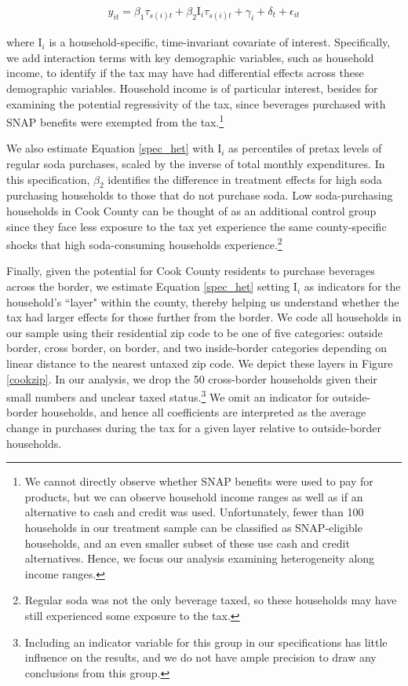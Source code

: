 \documentclass[12pt]{article}
\begin{document}
\begin{align}
	y_{it} = \beta_1 \tau_{s(i)t} + \beta_2 \text{I}_{i} \tau_{s(i)t} + \gamma_i + \delta_t + \epsilon_{it} \label{spec_het}
\end{align}

where $\text{I}_{i}$ is a household-specific, time-invariant covariate of interest. Specifically, we add interaction terms with key demographic variables, such as household income, to identify if the tax may have had differential effects across these demographic variables. Household income is of particular interest, besides for examining the potential regressivity of the tax, since beverages purchased with SNAP benefits were exempted from the tax.\footnote{We cannot directly observe whether SNAP benefits were used to pay for products, but we can observe household income ranges as well as if an alternative to cash and credit was used. Unfortunately, fewer than 100 households in our treatment sample can be classified as SNAP-eligible households, and an even smaller subset of these use cash and credit alternatives. Hence, we focus our analysis examining heterogeneity along income ranges.}

We also estimate Equation \ref{spec_het} with $\text{I}_{i}$ as percentiles of pretax levels of regular soda purchases, scaled by the inverse of total monthly expenditures. In this specification, $\beta_2$ identifies the difference in treatment effects for high soda purchasing households to those that do not purchase soda. Low soda-purchasing households in Cook County can be thought of as an additional control group since they face less exposure to the tax yet experience the same county-specific shocks that high soda-consuming households experience.\footnote{Regular soda was not the only beverage taxed, so these households may have still experienced some exposure to the tax.}

Finally, given the potential for Cook County residents to purchase beverages across the border, we estimate Equation \ref{spec_het} setting $\text{I}_{i}$ as indicators for the household's ``layer" within the county, thereby helping us understand whether the tax had larger effects for those further from the border. We code all households in our sample using their residential zip code to be one of five categories: outside border, cross border, on border, and two inside-border categories depending on linear distance to the nearest untaxed zip code. We depict these layers in Figure \ref{cookzip}. In our analysis, we drop the 50 cross-border households given their small numbers and unclear taxed status.\footnote{Including an indicator variable for this group in our specifications has little influence on the results, and we do not have ample precision to draw any conclusions from this group.} We omit an indicator for outside-border households, and hence all coefficients are interpreted as the average change in purchases during the tax for a given layer relative to outside-border households.
\end{document}
